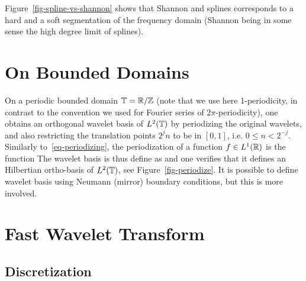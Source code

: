 Figure~\ref{fig-spline-vs-shannon} shows that Shannon and splines corresponds to a hard and a soft segmentation of the frequency domain (Shannon being in some sense the high degree limit of splines).





\section{On Bounded Domains}

On a periodic bounded domain $\mathbb{T}=\mathbb{R}/\mathbb{Z}$ (note that we use here 1-periodicity, in contrast to the convention we used for Fourier series of $2\pi$-periodicity), one obtains an orthogonal wavelet basis of $L^2(\mathbb{T})$ by periodizing the original wavelets, and also restricting the translation points $2^j n$ to be in $[0,1]$, i.e. $0 \leq n < 2^{-j}$. Similarly to~\eqref{eq-periodizing}, the periodization of a function $f \in L^1(\mathbb{R})$ is the function
The wavelet basis is thus define as
and one verifies that it defines an Hilbertian ortho-basis of $L^2(\mathbb{T})$, see Figure~\ref{fig-periodize}.
%
It is possible to define wavelet basis using Neumann (mirror) boundary conditions, but this is more involved.






\section{Fast Wavelet Transform}

\subsection{Discretization}

